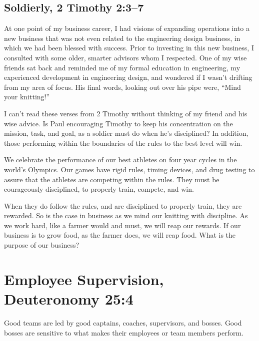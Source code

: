 \documentclass[12pt]{memoir}
\begin{document}
\subsection[Soldierly]{Soldierly, 2 Timothy 2:3--7}

At one point of my business career, I had visions of expanding operations
into a new business that was not even related to the engineering design
business, in which we had been blessed with success. Prior to investing
in this new business, I consulted with some older, smarter advisors
whom I respected. One of my wise friends sat back and reminded me
of my formal education in engineering, my experienced development
in engineering design, and wondered if I wasn't drifting from my area
of focus. His final words, looking out over his pipe were, ``Mind your knitting!''

I can't read these verses from 2 Timothy without thinking of my friend
and his wise advice. Is Paul encouraging Timothy to keep his concentration
on the mission, task, and goal, as a soldier must do when he's
disciplined? In addition, those performing within the boundaries of
the rules to the best level will win.

We celebrate the performance of our best athletes on four year cycles
in the world's Olympics. Our games have rigid rules, timing devices,
and drug testing to assure that the athletes are competing within
the rules. They must be courageously disciplined, to properly train,
compete, and win.

When they do follow the rules, and are disciplined to properly train,
they are rewarded. So is the case in business as we mind our knitting
with discipline. As we work hard, like a farmer would and must, we
will reap our rewards. If our business is to grow food, as the farmer
does, we will reap food. What is the purpose of our business?

\section[Employee Supervision]{Employee Supervision, Deuteronomy 25:4}


Good teams are led by good captains, coaches, supervisors, and bosses.
Good bosses are sensitive to what makes their employees or team members perform.
\end{document}

